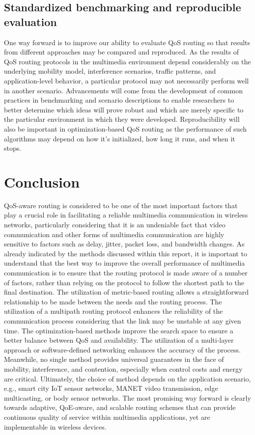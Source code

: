 \documentclass[12pt]{article}
\begin{document}
\subsection{Standardized benchmarking and reproducible evaluation}
One way forward is to improve our ability to evaluate QoS routing so that results from different approaches may be compared and reproduced. As the results of QoS routing protocols in the multimedia environment depend considerably on the underlying mobility model, interference scenarios, traffic patterns, and application-level behavior, a particular protocol may not necessarily perform well in another scenario. Advancements will come from the development of common practices in benchmarking and scenario descriptions to enable researchers to better determine which ideas will prove robust and which are merely specific to the particular environment in which they were developed. Reproducibility will also be important in optimization-based QoS routing as the performance of such algorithms may depend on how it’s initialized, how long it runs, and when it stops.
	\section{Conclusion}
	QoS-aware routing is considered to be one of the most important factors that play a crucial role in facilitating a reliable multimedia communication in wireless networks, particularly considering that it is an undeniable fact that video communication and other forms of multimedia communication are highly sensitive to factors such as delay, jitter, packet loss, and bandwidth changes. As already indicated by the methods discussed within this report, it is important to understand that the best way to improve the overall performance of multimedia communication is to ensure that the routing protocol is made aware of a number of factors, rather than relying on the protocol to follow the shortest path to the final destination. The utilization of metric-based routing allows a straightforward relationship to be made between the needs and the routing process. The utilization of a multipath routing protocol enhances the reliability of the communication process considering that the link may be unstable at any given time. The optimization-based methods improve the search space to ensure a better balance between QoS and availability. The utilization of a multi-layer approach or software-defined networking enhances the accuracy of the process.
    Meanwhile, no single method provides universal guarantees in the face of mobility, interference, and contention, especially when control costs and energy are critical. Ultimately, the choice of method depends on the application scenario, e.g., smart city IoT sensor networks, MANET video transmission, edge multicasting, or body sensor networks. The most promising way forward is clearly towards adaptive, QoE-aware, and scalable routing schemes that can provide continuous quality of service within multimedia applications, yet are implementable in wireless devices.
	



	
\end{document}
